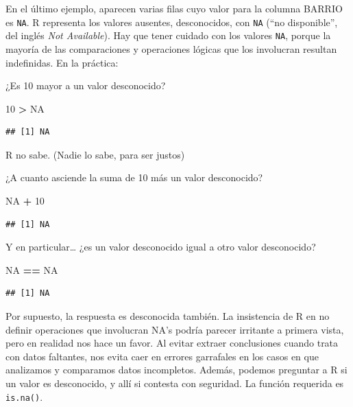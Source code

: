 \documentclass[spanish,]{book}
\newenvironment{Shaded}{\begin{snugshade}}{\end{snugshade}}
\newcommand{\DecValTok}[1]{\textcolor[rgb]{0.00,0.00,0.81}{#1}}
\newcommand{\OperatorTok}[1]{\textcolor[rgb]{0.81,0.36,0.00}{\textbf{#1}}}
\newcommand{\OtherTok}[1]{\textcolor[rgb]{0.56,0.35,0.01}{#1}}
\newcommand{\StringTok}[1]{\textcolor[rgb]{0.31,0.60,0.02}{#1}}
\begin{document}
En el último ejemplo, aparecen varias filas cuyo valor para la columna BARRIO es \texttt{NA}. R representa los valores ausentes, desconocidos, con \texttt{NA} (``no disponible'', del inglés \emph{Not Available}). Hay que tener cuidado con los valores \texttt{NA}, porque la mayoría de las comparaciones y operaciones lógicas que los involucran resultan indefinidas. En la práctica:

¿Es 10 mayor a un valor desconocido?

\begin{Shaded}
\begin{Highlighting}[]
\DecValTok{10} \OperatorTok{>}\StringTok{ }\OtherTok{NA}
\end{Highlighting}
\end{Shaded}

\begin{verbatim}
## [1] NA
\end{verbatim}

R no sabe. (Nadie lo sabe, para ser justos)

¿A cuanto asciende la suma de 10 más un valor desconocido?

\begin{Shaded}
\begin{Highlighting}[]
\OtherTok{NA} \OperatorTok{+}\StringTok{ }\DecValTok{10}
\end{Highlighting}
\end{Shaded}

\begin{verbatim}
## [1] NA
\end{verbatim}

Y en particular\ldots{} ¿es un valor desconocido igual a otro valor desconocido?

\begin{Shaded}
\begin{Highlighting}[]
\OtherTok{NA} \OperatorTok{==}\StringTok{ }\OtherTok{NA}
\end{Highlighting}
\end{Shaded}

\begin{verbatim}
## [1] NA
\end{verbatim}

Por supuesto, la respuesta es desconocida también. La insistencia de R en no definir operaciones que involucran NA's podría parecer irritante a primera vista, pero en realidad nos hace un favor. Al evitar extraer conclusiones cuando trata con datos faltantes, nos evita caer en errores garrafales en los casos en que analizamos y comparamos datos incompletos. Además, podemos preguntar a R si un valor es desconocido, y allí si contesta con seguridad. La función requerida es \texttt{is.na()}.
\end{document}
